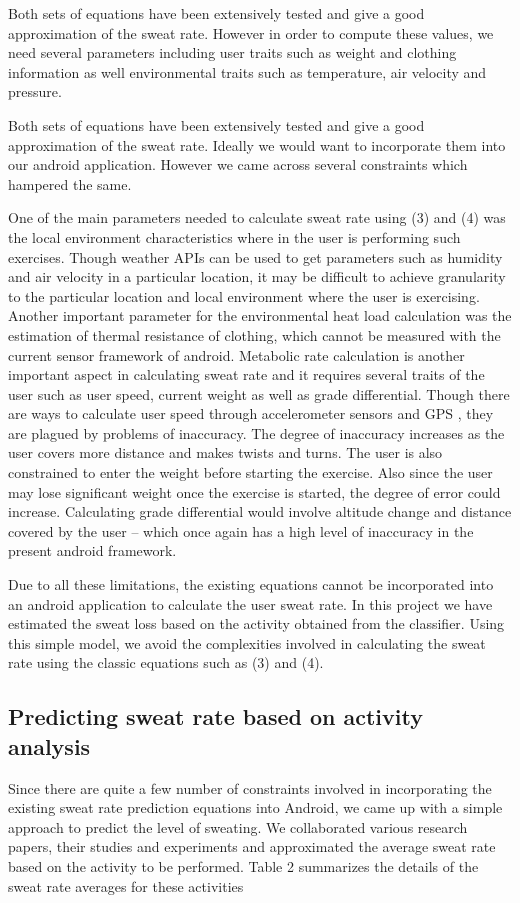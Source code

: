 \documentclass[conference]{IEEEtran}
\begin{document}
Both sets of equations have been extensively tested and give a good approximation of the sweat rate. However in order to compute these values, we need several parameters including user traits such as weight and clothing information as well environmental traits such as temperature, air velocity and pressure. 

Both sets of equations have been extensively tested and give a good approximation of the sweat rate. Ideally we would want to incorporate them into our android application. However we came across several constraints which hampered the same.

One of the main parameters needed to calculate sweat rate using (3) and (4) was the local environment characteristics where in the user is performing such exercises. Though weather APIs can be used to get parameters such as humidity and air velocity in a particular location, it may be difficult to achieve granularity to the particular location and local environment where the user is exercising. Another important parameter for the environmental heat load calculation was the estimation of thermal resistance of clothing, which cannot be measured with the current sensor framework of android. Metabolic rate calculation is another important aspect in calculating sweat rate and it requires several traits of the user such as user speed, current weight as well as grade differential. Though there are ways to calculate user speed through accelerometer sensors and GPS , they are plagued by problems of inaccuracy. The degree of inaccuracy increases as the user covers more distance and makes twists and turns. The user is also constrained to enter the weight before starting the exercise. Also since the user may lose significant weight once the exercise is started, the degree of error could increase. Calculating grade differential would involve altitude change and distance covered by the user – which once again has a high level of inaccuracy in the present android framework.
 
Due to all these limitations, the existing equations cannot be incorporated into an android application to calculate the user sweat rate. In this project we have estimated the sweat loss based on the activity obtained from the classifier. Using this simple model, we avoid the complexities involved in calculating the sweat rate using the classic equations such as (3) and (4).

\subsection{Predicting sweat rate based on activity analysis}
Since there are quite a few number of constraints involved in incorporating the existing sweat rate prediction equations into Android, we came up with a simple approach to predict the level of sweating. We collaborated various research papers, their studies and experiments \cite{sweat5}  \cite{sweat6} and approximated the average sweat rate based on the activity to be performed. Table 2 summarizes the details of the sweat rate averages for these activities
\end{document}
